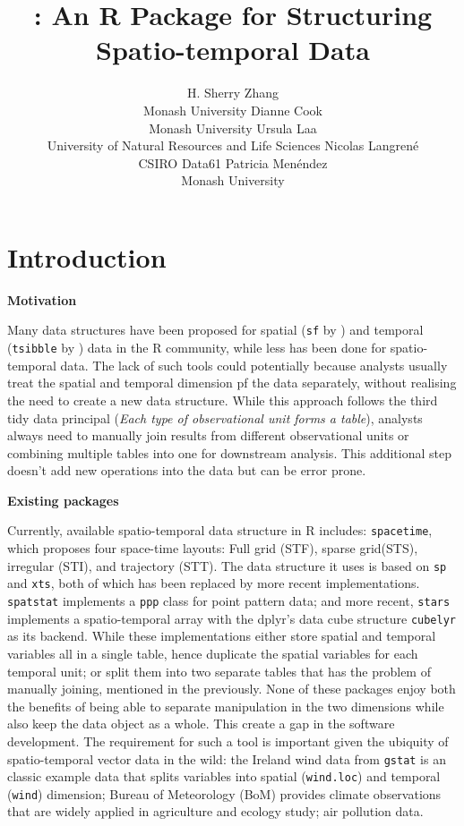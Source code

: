 \documentclass[
]{jss}
\author{
H. Sherry Zhang\\Monash University \And Dianne Cook\\Monash University
\AND Ursula Laa\\University of Natural Resources and Life Sciences
\AND Nicolas Langrené\\CSIRO Data61 \AND Patricia
Menéndez\\Monash University \AND
}
\title{\pkg{cubble}: An R Package for Structuring Spatio-temporal Data}
\begin{document}
\newpage

\hypertarget{introduction}{%
\section{Introduction}\label{introduction}}

\textbf{Motivation}

Many data structures have been proposed for spatial (\texttt{sf} by
\citet{sf}) and temporal (\texttt{tsibble} by \citet{tsibble}) data in
the R community, while less has been done for spatio-temporal data. The
lack of such tools could potentially because analysts usually treat the
spatial and temporal dimension pf the data separately, without realising
the need to create a new data structure. While this approach follows the
third tidy data principal \citep{tidydata} (\emph{Each type of
observational unit forms a table}), analysts always need to manually
join results from different observational units or combining multiple
tables into one for downstream analysis. This additional step doesn't
add new operations into the data but can be error prone. \newline

\textbf{Existing packages}

Currently, available spatio-temporal data structure in R includes:
\texttt{spacetime}\citep{spacetime}, which proposes four space-time
layouts: Full grid (STF), sparse grid(STS), irregular (STI), and
trajectory (STT). The data structure it uses is based on \texttt{sp}
\citep{sp} and \texttt{xts}\citep{xts}, both of which has been replaced
by more recent implementations. \texttt{spatstat} \citep{spatstat}
implements a \texttt{ppp} class for point pattern data; and more recent,
\texttt{stars} \citep{stars} implements a spatio-temporal array with the
dplyr's data cube structure \texttt{cubelyr} \citep{cubelyr} as its
backend. While these implementations either store spatial and temporal
variables all in a single table, hence duplicate the spatial variables
for each temporal unit; or split them into two separate tables that has
the problem of manually joining, mentioned in the previously. None of
these packages enjoy both the benefits of being able to separate
manipulation in the two dimensions while also keep the data object as a
whole. This create a gap in the software development. The requirement
for such a tool is important given the ubiquity of spatio-temporal
vector data in the wild: the Ireland wind data from \texttt{gstat} is an
classic example data that splits variables into spatial
(\texttt{wind.loc}) and temporal (\texttt{wind}) dimension; Bureau of
Meteorology (BoM) provides climate observations that are widely applied
in agriculture and ecology study; air pollution data. \newline
\end{document}
